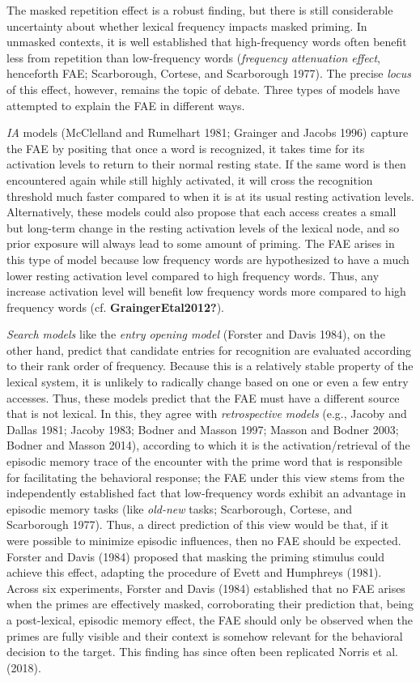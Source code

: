 \documentclass[
]{interact}
\begin{document}
The masked repetition effect is a robust finding, but there is still
considerable uncertainty about whether lexical frequency impacts masked
priming. In unmasked contexts, it is well established that
high-frequency words often benefit less from repetition than
low-frequency words (\emph{frequency attenuation effect}, henceforth
FAE; Scarborough, Cortese, and Scarborough 1977). The precise
\emph{locus} of this effect, however, remains the topic of debate. Three
types of models have attempted to explain the FAE in different ways.

\emph{IA} models (McClelland and Rumelhart 1981; Grainger and Jacobs
1996) capture the FAE by positing that once a word is recognized, it
takes time for its activation levels to return to their normal resting
state. If the same word is then encountered again while still highly
activated, it will cross the recognition threshold much faster compared
to when it is at its usual resting activation levels. Alternatively,
these models could also propose that each access creates a small but
long-term change in the resting activation levels of the lexical node,
and so prior exposure will always lead to some amount of priming. The
FAE arises in this type of model because low frequency words are
hypothesized to have a much lower resting activation level compared to
high frequency words. Thus, any increase activation level will benefit
low frequency words more compared to high frequency words (cf.
\textbf{GraingerEtal2012?}).

\emph{Search models} like the \emph{entry opening model} (Forster and
Davis 1984), on the other hand, predict that candidate entries for
recognition are evaluated according to their rank order of frequency.
Because this is a relatively stable property of the lexical system, it
is unlikely to radically change based on one or even a few entry
accesses. Thus, these models predict that the FAE must have a different
source that is not lexical. In this, they agree with \emph{retrospective
models} (e.g., Jacoby and Dallas 1981; Jacoby 1983; Bodner and Masson
1997; Masson and Bodner 2003; Bodner and Masson 2014), according to
which it is the activation/retrieval of the episodic memory trace of the
encounter with the prime word that is responsible for facilitating the
behavioral response; the FAE under this view stems from the
independently established fact that low-frequency words exhibit an
advantage in episodic memory tasks (like \emph{old-new} tasks;
Scarborough, Cortese, and Scarborough 1977). Thus, a direct prediction
of this view would be that, if it were possible to minimize episodic
influences, then no FAE should be expected. Forster and Davis (1984)
proposed that masking the priming stimulus could achieve this effect,
adapting the procedure of Evett and Humphreys (1981). Across six
experiments, Forster and Davis (1984) established that no FAE arises
when the primes are effectively masked, corroborating their prediction
that, being a post-lexical, episodic memory effect, the FAE should only
be observed when the primes are fully visible and their context is
somehow relevant for the behavioral decision to the target. This finding
has since often been replicated Norris et al. (2018).
\end{document}
